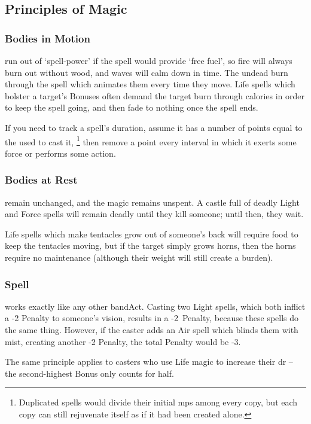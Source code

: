 \begin{multicols}{2}
\subsection{Principles of Magic}

\subsubsection{Bodies in Motion}
run out of `spell-power' if the spell would provide `free fuel', so fire will always burn out without wood, and waves will calm down in time.
The undead burn through the spell which animates them every time they move.
Life spells which bolster a target's Bonuses often demand the target burn through calories in order to keep the spell going, and then fade to nothing once the spell ends.

If you need to track a spell's duration, assume it has a number of points equal to the  used to cast it,%
\footnote{Duplicated spells would divide their initial \glspl{mp} among every copy, but each copy can still rejuvenate itself as if it had been created alone.}
then remove a point every \gls{interval} in which it exerts some force or performs some action.

\subsubsection{Bodies at Rest}
remain unchanged, and the magic remains unspent.
A castle full of deadly Light and Force spells will remain deadly until they kill someone; until then, they wait.

Life spells which make tentacles grow out of someone's back will require food to keep the tentacles moving, but if the target simply grows horns, then the horns require no maintenance (although their \gls{weight} will still create a burden).

\subsubsection{Spell }
works exactly like any other \gls{bandAct}.%
Casting two Light spells, which both inflict a -2 Penalty to someone's vision, results in a -2~Penalty, because these spells do the same thing.
However, if the caster adds an Air spell which blinds them with mist, creating another -2 Penalty, the total Penalty would be -3.

The same principle applies to casters who use Life magic to increase their \gls{dr} -- the second-highest Bonus only counts for half.


\end{multicols}
